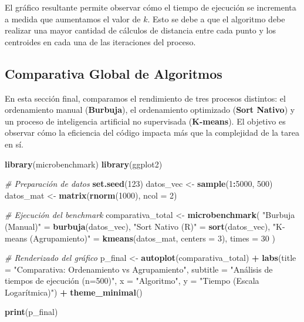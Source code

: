 \documentclass[]{llncs}
\newenvironment{Shaded}{\begin{snugshade}}{\end{snugshade}}
\newcommand{\AttributeTok}[1]{\textcolor[rgb]{0.13,0.29,0.53}{#1}}
\newcommand{\CommentTok}[1]{\textcolor[rgb]{0.56,0.35,0.01}{\textit{#1}}}
\newcommand{\DecValTok}[1]{\textcolor[rgb]{0.00,0.00,0.81}{#1}}
\newcommand{\FunctionTok}[1]{\textcolor[rgb]{0.13,0.29,0.53}{\textbf{#1}}}
\newcommand{\NormalTok}[1]{#1}
\newcommand{\OtherTok}[1]{\textcolor[rgb]{0.56,0.35,0.01}{#1}}
\newcommand{\SpecialCharTok}[1]{\textcolor[rgb]{0.81,0.36,0.00}{\textbf{#1}}}
\newcommand{\StringTok}[1]{\textcolor[rgb]{0.31,0.60,0.02}{#1}}
\begin{document}
El gráfico resultante permite observar cómo el tiempo de ejecución se
incrementa a medida que aumentamos el valor de \(k\). Esto se debe a que
el algoritmo debe realizar una mayor cantidad de cálculos de distancia
entre cada punto y los centroides en cada una de las iteraciones del
proceso.

\subsection{Comparativa Global de
Algoritmos}\label{comparativa-global-de-algoritmos}

En esta sección final, comparamos el rendimiento de tres procesos
distintos: el ordenamiento manual (\textbf{Burbuja}), el ordenamiento
optimizado (\textbf{Sort Nativo}) y un proceso de inteligencia
artificial no supervisada (\textbf{K-means}). El objetivo es observar
cómo la eficiencia del código impacta más que la complejidad de la tarea
en sí.

\begin{Shaded}
\begin{Highlighting}[]
\FunctionTok{library}\NormalTok{(microbenchmark)}
\FunctionTok{library}\NormalTok{(ggplot2)}

\CommentTok{\# Preparación de datos}
\FunctionTok{set.seed}\NormalTok{(}\DecValTok{123}\NormalTok{)}
\NormalTok{datos\_vec }\OtherTok{\textless{}{-}} \FunctionTok{sample}\NormalTok{(}\DecValTok{1}\SpecialCharTok{:}\DecValTok{5000}\NormalTok{, }\DecValTok{500}\NormalTok{)}
\NormalTok{datos\_mat }\OtherTok{\textless{}{-}} \FunctionTok{matrix}\NormalTok{(}\FunctionTok{rnorm}\NormalTok{(}\DecValTok{1000}\NormalTok{), }\AttributeTok{ncol =} \DecValTok{2}\NormalTok{)}

\CommentTok{\# Ejecución del benchmark}
\NormalTok{comparativa\_total }\OtherTok{\textless{}{-}} \FunctionTok{microbenchmark}\NormalTok{(}
  \StringTok{"Burbuja (Manual)"} \OtherTok{=} \FunctionTok{burbuja}\NormalTok{(datos\_vec),}
  \StringTok{"Sort Nativo (R)"} \OtherTok{=} \FunctionTok{sort}\NormalTok{(datos\_vec),}
  \StringTok{"K{-}means (Agrupamiento)"} \OtherTok{=} \FunctionTok{kmeans}\NormalTok{(datos\_mat, }\AttributeTok{centers =} \DecValTok{3}\NormalTok{),}
  \AttributeTok{times =} \DecValTok{30}
\NormalTok{)}

\CommentTok{\# Renderizado del gráfico}
\NormalTok{p\_final }\OtherTok{\textless{}{-}} \FunctionTok{autoplot}\NormalTok{(comparativa\_total) }\SpecialCharTok{+}
  \FunctionTok{labs}\NormalTok{(}\AttributeTok{title =} \StringTok{"Comparativa: Ordenamiento vs Agrupamiento"}\NormalTok{,}
       \AttributeTok{subtitle =} \StringTok{"Análisis de tiempos de ejecución (n=500)"}\NormalTok{,}
       \AttributeTok{x =} \StringTok{"Algoritmo"}\NormalTok{, }\AttributeTok{y =} \StringTok{"Tiempo (Escala Logarítmica)"}\NormalTok{) }\SpecialCharTok{+}
  \FunctionTok{theme\_minimal}\NormalTok{()}

\FunctionTok{print}\NormalTok{(p\_final)}
\end{Highlighting}
\end{Shaded}
\end{document}
